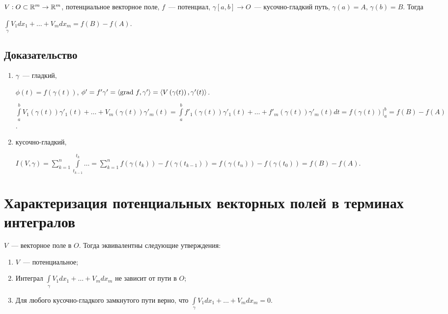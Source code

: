 \documentclass{article}
\begin{document}
        $V : O \subset \mathbb{R}^m \rightarrow \mathbb{R}^m$, потенциальное векторное поле, $f$~--- потенциал, $\gamma [a, b] \rightarrow O$~--- кусочно-гладкий путь, $\gamma(a) = A$, $\gamma(b) = B$. Тогда
        
        $\int\limits_{\gamma} V_1 dx_1 + \ldots + V_m dx_m = f(B) - f(A)$.
        
        \subsection{Доказательство}
        
            \begin{enumerate}
            
                \item $\gamma$~--- гладкий, 
                
                    $\phi(t) = f(\gamma(t))$, $\phi' = f' \gamma' = \langle \grad f, \gamma' \rangle = \langle V \left( \gamma(t) \right), \gamma'(t) \rangle$.
                    
                    $\int\limits^b_a V_1 (\gamma(t)) \gamma'_1(t) + \ldots + V_m (\gamma(t)) \gamma'_m(t) = \int\limits^b_a f'_1 (\gamma(t)) \gamma'_1(t) + \ldots + f'_m (\gamma(t)) \gamma'_m(t) dt = f(\gamma(t)) \bigg|^b_a = f(B) - f(A)$.
                
                \item кусочно-гладкий,
                
                    $I \left( V, \gamma \right) = \sum\limits^n_{k = 1} \int\limits^{t_k}_{t_{k - 1}} \ldots = \sum\limits^n_{k = 1} f \left( \gamma (t_k) \right) - f \left( \gamma ( t_{k - 1} ) \right) = f(\gamma(t_n)) - f(\gamma(t_0)) = f(B) - f(A)$.
                    
            \end{enumerate}
            
    \newpage
    
    \section{Характеризация потенциальных векторных полей в терминах интегралов}
    
        $V$~--- векторное поле в $O$. Тогда эквивалентны следующие утверждения:
        
        \begin{enumerate}
        
            \item $V$~--- потенциальное;
            
            \item Интеграл $\int\limits_{\gamma} V_1 dx_1 + \ldots + V_m dx_m$ не зависит от пути в $O$;
            
            \item Для любого кусочно-гладкого замкнутого пути верно, что $\int\limits_{\gamma} V_1 dx_1 + \ldots + V_m dx_m = 0$.
            
        \end{enumerate}
            
\end{document}
